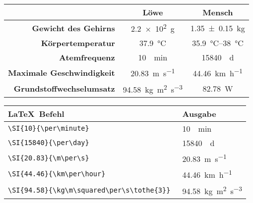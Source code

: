\documentclass["WS\space 16-17\space -\space LaTeX-Kurs\space -\space Praesentation\space -\space 3.tex"]{subfiles}
\begin{document}
\begin{frame}[fragile]
	\Losung
	\begin{outputbox}
		\vspace{-0.1cm}
		\begin{center}
			\begin{tabular}{r|cc}
				\hline
				&	\textbf{Löwe}										& \textbf{Mensch} 						\\ \hline
				\textbf{Gewicht des Gehirns}		&	\SI{2.2e2}{\g}										& \SI{1.35 \pm 0.15}{\kg}				\\ 
				\textbf{Körpertemperatur}			&	\SI{37.9}{\degreeCelsius}							& \SIrange{35.9}{38}{\degreeCelsius}	\\
				\textbf{Atemfrequenz}				&	\SI{10}{\per \minute}								& \SI{15840}{\per\day} 					\\
				\textbf{Maximale Geschwindigkeit}	&	\SI{20.83}{\m\per\s}								& \SI{44.46}{\km\per\hour} 				\\ 
				\textbf{Grundstoffwechselumsatz}	&	\SI{94.58}{\kg\meter\squared\per\second\tothe{3}}	&  \SI{82.78}{\watt}\\
				\hline
			\end{tabular}
		\end{center}
		\vspace{-0.1cm}
	\end{outputbox}

				\begin{center}
	\begin{tabular}{ll}
		\toprule
		\LaTeX\ Befehl						&	Ausgabe						\\ \midrule
		\lstinline|\SI{10}{\per\minute} |			&	\SI{10}{\per\minute} 					\\
		\lstinline|\SI{15840}{\per\day} |		&	\SI{15840}{\per\day} 		\\
		\lstinline|\SI{20.83}{\m\per\s} |		&	\SI{20.83}{\m\per\s}			\\
		\lstinline|\SI{44.46}{\km\per\hour} |		&	\SI{44.46}{\km\per\hour}			\\
		\lstinline|\SI{94.58}{\kg\m\squared\per\s\tothe{3}} |		&	\SI{94.58}{\kg\m\squared\per\s\tothe{3}}			\\
		\bottomrule
	\end{tabular}
\end{center}
\end{frame}
\end{document}

